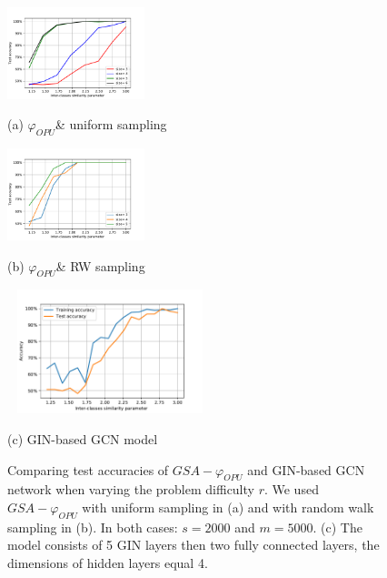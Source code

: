 \documentclass{article}
\begin{document}
\begin{figure}[htb]
%
\begin{minipage}[b]{.48\linewidth}
  \centering
  \centerline{\includegraphics[width=4.0cm]{figs/LightOn_adj_SBM_Similarity_graphlet_size.pdf}}
  \centerline{(a) $\varphi_{OPU}$\& uniform sampling}\medskip
\end{minipage}
\hfill
\begin{minipage}[b]{0.48\linewidth}
  \centering
  \centerline{\includegraphics[width=4.0cm]{figs/LightOn_adj_SBM_similarity_graphlet_size_RW.pdf}}
  \centerline{(b) $\varphi_{OPU}$\& RW sampling}\medskip
\end{minipage}
%
\begin{minipage}[b]{1.0\linewidth}
  \centering
  \centerline{\includegraphics[width=6cm,height=3.6cm]{figs/GCN.pdf}}
  \centerline{(c) GIN-based GCN model}\medskip
\end{minipage}
\caption{Comparing test accuracies of $GSA-\varphi_{OPU}$ and GIN-based GCN network when varying the problem difficulty $r$. We used $GSA-\varphi_{OPU}$ with uniform sampling in (a) and with random walk sampling in (b). In both cases: $s=2000$ and $m=5000$. (c) The model consists of 5 GIN layers then two fully connected layers, the dimensions of hidden layers  equal 4.}
\label{fig:GCN}
%
\end{figure}
\end{document}
